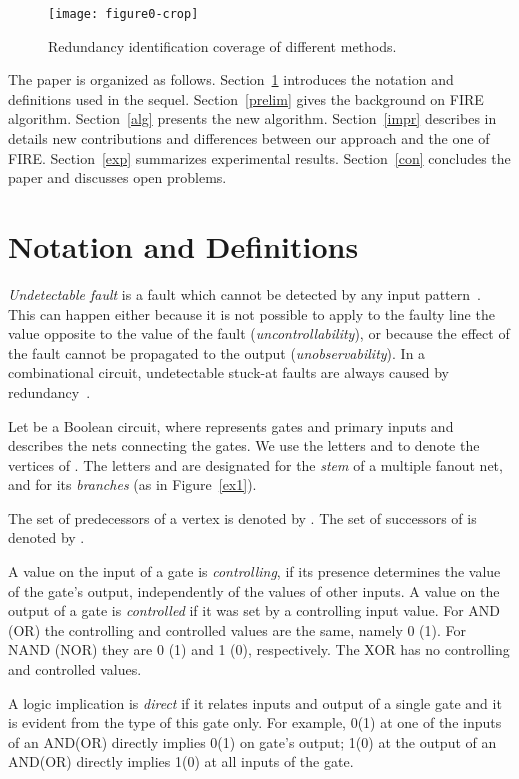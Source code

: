 \documentclass[conference]{IEEEtran} \usepackage{times}
\begin{document}
\begin{figure}[t!]
\begin{center}
\texttt{[image: figure0-crop]}
\caption{Redundancy identification coverage of different methods.} \label{f0}
\end{center}
\end{figure}

The paper is organized as follows. Section~\ref{nota} introduces the
notation and definitions used in the sequel.  Section~\ref{prelim} gives the background
on FIRE algorithm. Section~\ref{alg} presents the new algorithm. Section~\ref{impr} describes in details new contributions and differences between our approach and the one of FIRE.
Section~\ref{exp} summarizes experimental results.  Section~\ref{con}
concludes the paper and discusses open problems.

\section{Notation and Definitions} \label{nota}

{\em Undetectable fault} is a fault which cannot be detected by any
input pattern~\cite{Fr67}.  This can happen either because it is not
possible to apply to the faulty line the value opposite to the value
of the fault ({\em uncontrollability}), or because the effect of the
fault cannot be propagated to the output ({\em unobservability}). In a
combinational circuit, undetectable stuck-at faults are always caused
by redundancy~\cite{IyA96}.


Let  be a Boolean circuit, where  represents gates and
primary inputs and  describes the nets connecting the gates.  We
use the letters  and  to denote the vertices of .  The
letters  and  are designated for the {\em stem} of a multiple
fanout net, and  for its {\em branches} (as in
Figure~\ref{ex1}).

The set of predecessors of a vertex  is denoted by .  The set of successors of  is
denoted by .

A value on the input of a gate is {\em controlling}, if its presence
determines the value of the gate's output, independently of the values
of other inputs.
A value on the output of a gate is {\em controlled} if it was set by
a controlling input value.  For AND (OR) the controlling and controlled
values are the same, namely 0 (1).  For NAND (NOR) they are 0 (1) and
1 (0), respectively. The XOR has no controlling and controlled values. 

A logic implication is {\em direct} if it relates inputs and output of
a single gate and it is evident from the type of this gate only. For
example, 0(1) at one of the inputs of an AND(OR) directly implies 0(1)
on gate's output; 1(0) at the output of an AND(OR) directly implies
1(0) at all inputs of the gate.
\end{document}
